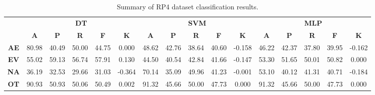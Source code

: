 \begin{landscape}
\begin{table}[htbp]
\footnotesize
\centering
\caption{Summary of RP4 dataset classification results.}
\label{tab:base_female}
\begin{tabular}{|c|c|c|c|c|c|c|c|c|c|c|c|c|c|c|c|}
\hline
\multirow{2}{*}{}	& \multicolumn{5}{c|}{\textbf{DT}}												& \multicolumn{5}{c|}{\textbf{SVM}}												& \multicolumn{5}{c|}{\textbf{MLP}}												\\ \cline{2-16} 
					& \textbf{A}	& \textbf{P}	& \textbf{R}	& \textbf{F}	& \textbf{K}	& \textbf{A}	& \textbf{P}	& \textbf{R}	& \textbf{F}	& \textbf{K}	& \textbf{A}	& \textbf{P}	& \textbf{R}	& \textbf{F}	& \textbf{K}	\\ \hline
\textbf{AE}			& 80.98			& 40.49			& 50.00			& 44.75			& 0.000			& 48.62			& 42.76			& 38.64			& 40.60			& -0.158			& 46.22			& 42.37			& 37.80			& 39.95			& -0.162			\\ \hline
\textbf{EV}			& 55.02			& 59.13			& 56.74			& 57.91			& 0.130			& 44.50			& 40.54			& 42.84			& 41.66			& -0.147			& 53.30			& 51.65			& 50.01			& 50.82			& 0.000			\\ \hline
\textbf{NA}			& 36.19			& 32.53			& 29.66			& 31.03			& -0.364			& 70.14			& 35.09			& 49.96			& 41.23			& -0.001			& 53.10			& 40.12			& 41.31			& 40.71			& -0.184			\\ \hline
\textbf{OT}			& 90.93			& 50.93			& 50.06			& 50.49			& 0.002			& 91.32			& 45.66			& 50.00			& 47.73			& 0.000			& 91.32			& 45.66			& 50.00			& 47.73			& 0.000			\\ \hline
\end{tabular}
\end{table}
\end{landscape}
